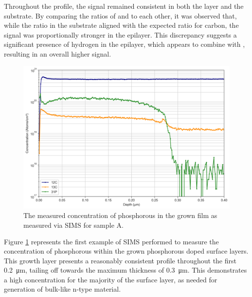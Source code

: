 \begin{refsection}
Throughout the profile, the  signal remained consistent in both the layer and the substrate. By comparing the ratios of  and  to each other, it was observed that, while the ratio in the substrate aligned with the expected ratio for carbon, the  signal was proportionally stronger in the epilayer. This discrepancy suggests a significant presence of hydrogen in the epilayer, which appears to combine with , resulting in an overall higher  signal.

\begin{figure}[H]
\centering
\includegraphics[width=\textwidth]{SIMS Depth Profile 49A.png}
\caption{The measured concentration of phosphorous in the grown film as measured via SIMS for sample A.}
\label{fig:sims_A}
\end{figure}

Figure \ref{fig:sims_A} represents the first example of SIMS performed to measure the concentration of phosphorous within the grown phosphorous doped surface layers. This growth layer presents a reasonably consistent profile throughout the first 0.2~\si{\micro\metre}, tailing off towards the maximum thickness of 0.3~\si{\micro\metre}. This demonstrates a high concentration for the majority of the surface layer, as needed for generation of bulk-like n-type material.


\end{refsection}
